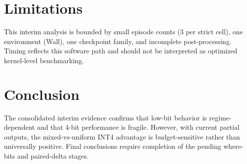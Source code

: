 \documentclass{article}
\begin{document}
\section{Limitations}
This interim analysis is bounded by small episode counts (3 per strict cell), one environment (Wall), one checkpoint family, and incomplete post-processing.
Timing reflects this software path and should not be interpreted as optimized kernel-level benchmarking.

\section{Conclusion}
The consolidated interim evidence confirms that low-bit behavior is regime-dependent and that 4-bit performance is fragile.
However, with current partial outputs, the mixed-vs-uniform INT4 advantage is budget-sensitive rather than universally positive.
Final conclusions require completion of the pending where-bits and paired-delta stages.
\end{document}
